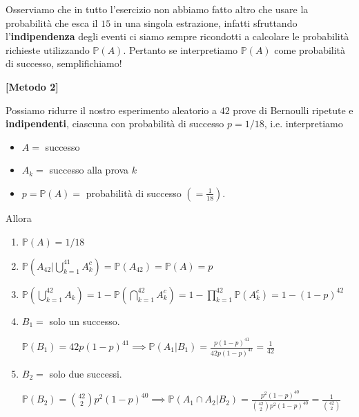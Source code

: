 \begin{enumerate}
\begin{oss}
Osserviamo che in tutto l'esercizio non abbiamo fatto altro che usare la probabilità che esca il $15$ in una singola estrazione, infatti sfruttando l'\textbf{indipendenza} degli eventi ci siamo sempre ricondotti a calcolare le probabilità richieste utilizzando $\mathbb{P}( A)$. Pertanto se interpretiamo $\mathbb{P}( A)$ come probabilità di successo, semplifichiamo!
\end{oss}
\end{enumerate}
\textbf{[Metodo 2]}

Possiamo ridurre il nostro esperimento aleatorio a $42$ prove di Bernoulli ripetute e \textbf{indipendenti}, ciascuna con probabilità di successo $p=1/18$, i.e. interpretiamo
\begin{itemize}
\item $A=$ successo
\item $A_{k} =$ successo alla prova $k$
\item $p=\mathbb{P}( A) =$ probabilità di successo $\left( =\frac{1}{18}\right)$.
\end{itemize}

Allora
\begin{enumerate}
\item $\mathbb{P}( A) =1/18$
\item $\mathbb{P}\left( A_{42} |\bigcup _{k=1}^{41} A_{k}^{c}\right) =\mathbb{P}( A_{42}) =\mathbb{P}( A) =p$
\item $\mathbb{P}\left(\bigcup _{k=1}^{42} A_{k}\right) =1-\mathbb{P}\left(\bigcap _{k=1}^{42} A_{k}^{c}\right) =1-\prod _{k=1}^{42}\mathbb{P}\left( A_{k}^{c}\right) =1-( 1-p)^{42}$
\item $B_{1} =$ solo un successo.

$\mathbb{P}( B_{1}) =42p( 1-p)^{41} \implies \mathbb{P}( A_{1} |B_{1}) =\frac{p( 1-p)^{41}}{42p( 1-p)^{41}} =\frac{1}{42}$
\item $B_{2} =$ solo due successi.

$\mathbb{P}( B_{2}) =\binom{42}{2} p^{2}( 1-p)^{40} \implies \mathbb{P}( A_{1} \cap A_{2} |B_{2}) =\frac{p^{2}( 1-p)^{40}}{\binom{42}{2} p^{2}( 1-p)^{40}} =\frac{1}{\binom{42}{2}}$
\end{enumerate}
\subsubsection{}

